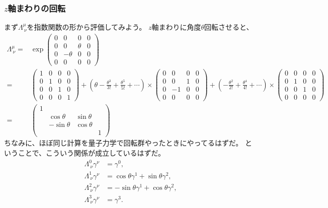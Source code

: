 \documentclass[10pt,a4paper]{jarticle}
\begin{document}
\subsubsection{$z$軸まわりの回転}
まず$\Lambda^\mu_{~\nu}$を指数関数の形から評価してみよう。
$z$軸まわりに角度$\theta$回転させると、
\begin{align}
\Lambda^{\mu}_{~\nu}
=&
\exp\left(
\begin{array}{cccc}
0 & 0 & 0 & 0 \\
0 & 0 & \theta & 0 \\
0 & -\theta & 0 & 0 \\
0 & 0 & 0 & 0
\end{array}
\right) \nonumber\\
%
=&
\left(\begin{array}{cccc}
1 & 0 & 0 & 0 \\
0 & 1 & 0 & 0 \\
0 & 0 & 1 & 0 \\
0 & 0 & 0 & 1
\end{array}
\right)
+
\left( \theta - \frac{\theta^3}{3!} + \frac{\theta^5}{5!} + \cdots \right) \times
\left(
\begin{array}{cccc}
0 & 0 & 0 & 0 \\
0 & 0 & 1 & 0 \\
0 & -1 & 0 & 0 \\
0 & 0 & 0 & 0
\end{array}
\right)
+
\left( - \frac{\theta^2}{2!} + \frac{\theta^4}{4!} + \cdots \right) \times
\left(\begin{array}{cccc}
0 & 0 & 0 & 0 \\
0 & 1 & 0 & 0 \\
0 & 0 & 1 & 0 \\
0 & 0 & 0 & 0
\end{array}
\right)
\nonumber\\
%
=&
\left(\begin{array}{cccc}
1 &&& \\
& \cos\theta & \sin\theta &\\
& -\sin\theta & \cos\theta &\\
&&& 1
\end{array}\right)
\end{align}
ちなみに、ほぼ同じ計算を量子力学で回転群やったときにやってるはずだ。
ということで、こういう関係が成立しているはずだ。
\begin{align}
\Lambda^0_{~\nu} \gamma^\nu &= \gamma^0 \label{eq:rotation gamma 0}, \\
\Lambda^1_{~\nu} \gamma^\nu &= \cos\theta \gamma^1 + \sin\theta\gamma^2 \label{eq:rotation gamma 1}, \\
\Lambda^2_{~\nu} \gamma^\nu &= -\sin\theta \gamma^1 + \cos\theta \gamma^2 \label{eq:rotation gamma 2}, \\
\Lambda^3_{~\nu} \gamma^\nu &= \gamma^3. \label{eq:rotation gamma 3}
\end{align}
\end{document}
